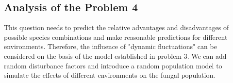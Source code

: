 \subsection{Analysis of the Problem 4}
This question needs to predict the relative advantages and disadvantages of possible species combinations and make reasonable predictions for different environments. Therefore, the influence of "dynamic fluctuations" can be considered on the basis of the model established in problem 3. We can add random disturbance factors and introduce a random population model to simulate the effects of different environments on the fungal population.
